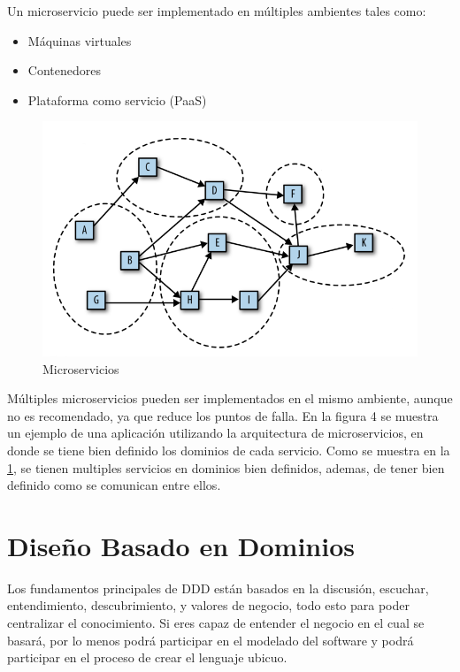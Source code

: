 \documentclass[12pt,twoside]{reedthesis}
\providecommand{\tightlist}{%
  \setlength{\itemsep}{0pt}\setlength{\parskip}{0pt}}
\theoremstyle{definition}
\theoremstyle{definition}
\theoremstyle{definition}
\theoremstyle{remark}
\begin{document}
Un microservicio puede ser implementado en múltiples ambientes tales
como:
\begin{itemize}
\tightlist
\item
  Máquinas virtuales
\item
  Contenedores
\item
  Plataforma como servicio (PaaS)
\end{itemize}
\begin{figure}[h!]
  \centering
  \includegraphics[scale=0.5]{./figure/Cap3/monoFig2.png}
  \caption{Microservicios}\label{figura2}
\end{figure}
Múltiples microservicios pueden ser implementados en el mismo ambiente,
aunque no es recomendado, ya que reduce los puntos de falla. En la
figura 4 se muestra un ejemplo de una aplicación utilizando la
arquitectura de microservicios, en donde se tiene bien definido los
dominios de cada servicio. Como se muestra en la \ref{figura2}, se
tienen multiples servicios en dominios bien definidos, ademas, de tener
bien definido como se comunican entre ellos.

\hypertarget{diseno-basado-en-dominios}{%
\section{Diseño Basado en Dominios}\label{diseno-basado-en-dominios}}

Los fundamentos principales de DDD están basados en la discusión,
escuchar, entendimiento, descubrimiento, y valores de negocio, todo esto
para poder centralizar el conocimiento. Si eres capaz de entender el
negocio en el cual se basará, por lo menos podrá participar en el
modelado del software y podrá participar en el proceso de crear el
lenguaje ubicuo.
\end{document}
